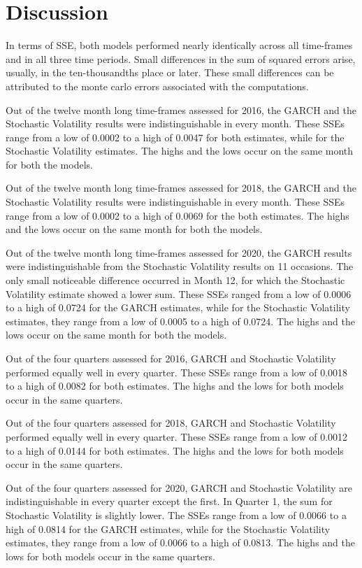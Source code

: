 \documentclass[12pt,letterpaper,reqno,fleqn]{article}
\begin{document}
\newpage
\section{Discussion}
In terms of SSE, both models performed nearly identically across all time-frames and in all three time periods. Small differences in the sum of squared errors arise, usually, in the ten-thousandths place or later. These small differences can be attributed to the monte carlo errors associated with the computations. 

Out of the twelve month long time-frames assessed for 2016, the GARCH and the Stochastic Volatility results were indistinguishable in every month. These SSEs range from a low of 0.0002 to a high of 0.0047 for both estimates, while for the Stochastic Volatility estimates. The highs and the lows occur on the same month for both the models.

Out of the twelve month long time-frames assessed for 2018, the GARCH and the Stochastic Volatility results were indistinguishable in every month. These SSEs range from a low of 0.0002 to a high of 0.0069 for the both estimates. The highs and the lows occur on the same month for both the models.

Out of the twelve month long time-frames assessed for 2020, the GARCH results were indistinguishable from the Stochastic Volatility results on 11 occasions. The only small noticeable difference occurred in Month 12, for which the Stochastic Volatility estimate showed a lower sum. These SSEs ranged from a low of 0.0006 to a high of 0.0724 for the GARCH estimates, while for the Stochastic Volatility estimates, they range from a low of 0.0005 to a high of 0.0724. The highs and the lows occur on the same month for both the models.

Out of the four quarters assessed for 2016, GARCH and Stochastic Volatility performed equally well in every quarter. These SSEs range from a low of 0.0018 to a high of 0.0082 for both estimates. The highs and the lows for both models occur in the same quarters.  

Out of the four quarters assessed for 2018, GARCH and Stochastic Volatility performed equally well in every quarter. These SSEs range from a low of 0.0012 to a high of 0.0144 for both estimates. The highs and the lows for both models occur in the same quarters.

Out of the four quarters assessed for 2020, GARCH and Stochastic Volatility are indistinguishable in every quarter except the first. In Quarter 1, the sum for Stochastic Volatility is slightly lower. The SSEs range from a low of 0.0066 to a high of 0.0814 for the GARCH estimates, while for the Stochastic Volatility estimates, they range from a low of 0.0066 to a high of 0.0813. The highs and the lows for both models occur in the same quarters.  
\end{document}
